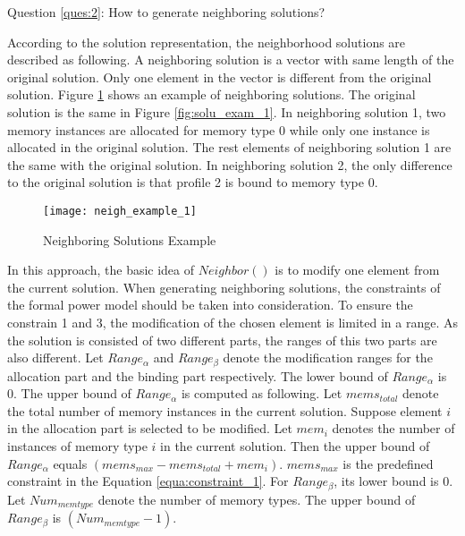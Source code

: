 		Question \ref{ques:2}: How to generate neighboring solutions?
		
		According to the solution representation, the neighborhood solutions are described
		as following. 
		A neighboring solution is a vector with same length of the
		original solution. Only one element in the vector is different from the
		original solution.
		Figure \ref{fig:neigh_solu_exam_1} shows an example of neighboring solutions.
		The original solution is the same in Figure \ref{fig:solu_exam_1}.
		In neighboring solution 1, two memory instances are allocated for memory type 0
		while only one instance is allocated in the original solution.
		The rest elements of neighboring solution 1 are the same with the original solution.
		In neighboring solution 2, the only difference to the original solution is that
		profile 2 is bound to memory type 0.
		\begin{figure}[h]
			\begin{center}
				\texttt{[image: neigh\_example\_1]}
				\caption{Neighboring Solutions Example}
				\label{fig:neigh_solu_exam_1}
			\end{center}
		\end{figure}

		In this approach, the basic idea of $Neighbor()$ is to modify one element from the
		current solution. When generating neighboring solutions, the constraints of the formal
		power model should be taken into consideration.
		To ensure the constrain 1 and 3, the modification of the chosen element is limited in a
		range. As the solution is consisted of two different parts, the ranges of this
		two parts are also different.
		Let $Range_{\alpha}$ and $Range_{\beta}$ denote the modification ranges for
		the allocation part and the binding part respectively.
		The lower bound of $Range_{\alpha}$ is 0. The upper bound of $Range_{\alpha}$ is
		computed as following.
		Let $mems_{total}$ denote the total number of memory instances in the current solution.
		Suppose element $i$ in the allocation part is selected to be modified.
		Let $mem_{i}$ denotes the number of instances of memory type $i$ in the current solution.		
		Then the upper bound of $Range_{\alpha}$ equals $(mems_{max}-mems_{total}+mem_{i})$.
		$mems_{max}$ is the predefined constraint in the Equation \ref{equa:constraint_1}.
		For $Range_{\beta}$, its lower bound is 0.
		Let $Num_{memtype}$ denote the number of memory types.
		The upper bound of $Range_{\beta}$ is $(Num_{memtype}-1)$.
		
